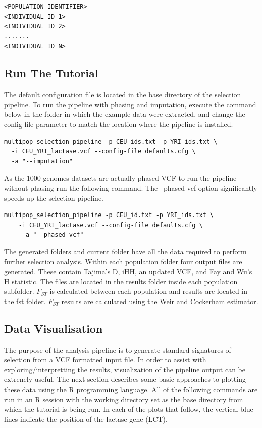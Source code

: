 \documentclass[a4paper,10pt]{article}
\begin{document}
\begin{verbatim}
<POPULATION_IDENTIFIER>
<INDIVIDUAL ID 1>
<INDIVIDUAL ID 2>
.......
<INDIVIDUAL ID N>
\end{verbatim}
\subsection{Run The Tutorial}
The default configuration file is located in the base directory of the
selection pipeline. To run the pipeline with phasing and imputation, execute the command below in the folder in which the example data were extracted, and change the
--config-file parameter to match the location where the pipeline is installed.\\
\begin{verbatim}
multipop_selection_pipeline -p CEU_ids.txt -p YRI_ids.txt \
  -i CEU_YRI_lactase.vcf --config-file defaults.cfg \
  -a "--imputation"
\end{verbatim}

\noindent
As the 1000 genomes datasets are actually phased VCF to run the pipeline without phasing run the following command. The --phased-vcf option significantly speeds up the selection pipeline.

\begin{verbatim}
multipop_selection_pipeline -p CEU_id.txt -p YRI_ids.txt \
    -i CEU_YRI_lactase.vcf --config-file defaults.cfg \
    --a "--phased-vcf"    
\end{verbatim} 

\noindent
The generated folders and current folder have all the data required to
perform further selection analysis. Within each population folder four
output files are generated.  These contain Tajima's D, iHH, an updated
VCF, and Fay and Wu's H statistic. The files are located in the
results folder inside each population subfolder. $F_{ST}$ is calculated
between each population and results are located in the fst folder. $F_{ST}$
results are calculated using the Weir and Cockerham estimator.

\subsection{Data Visualisation}
The purpose of the analysis pipeline is to generate standard signatures of
selection from a VCF formatted input file. In order to assist with
exploring/interpretting the results, visualization of the pipeline
output can be extrenely useful.
The next section describes some basic approaches to 
plotting these data using the R programming language. All of the following
commands are run in an R session with the working directory set as the base
directory from which the tutorial is being run. In each of the plots
that follow, the vertical blue lines indicate the position of the
lactase gene (LCT).
\end{document}
